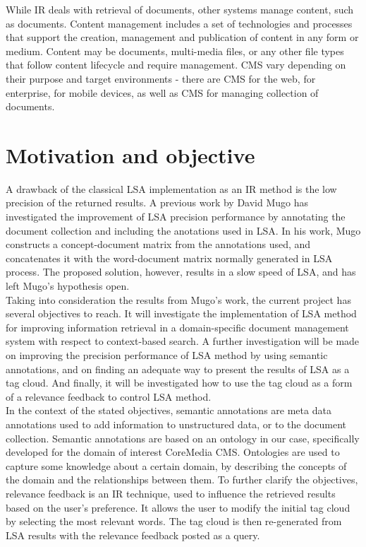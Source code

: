 \begin{center}
While \gls{IR} deals with retrieval of documents, other systems manage content, such as documents. Content management includes a set of technologies and processes that support the creation, management and publication of content in any form or medium. Content may be documents, multi-media files, or any other file types that follow content lifecycle and require management. \gls{CMS} vary depending on their purpose and target environments - there are \gls{CMS} for the web, for enterprise, for mobile devices, as well as \gls{CMS} for managing collection of documents. \\

\section{Motivation and objective}
\label{sec:introduction:motandobj}  
A drawback of the classical \gls{LSA} implementation as an \gls{IR} method is the low precision of the returned results. A previous work by David Mugo \cite{mugo10} has investigated the improvement of \gls{LSA} precision performance by annotating the document collection and including the anotations used in \gls{LSA}. In his work, Mugo constructs a concept-document matrix from the annotations used, and concatenates it with the word-document matrix normally generated in \gls{LSA} process. The proposed solution, however, results in a slow speed of \gls{LSA}, and has left Mugo's hypothesis open. \\

Taking into consideration the results from Mugo's work, the current project has several objectives to reach. It will investigate the implementation of \gls{LSA} method for improving information retrieval in a domain-specific document management system with respect to context-based search. A further investigation will be made on improving the precision performance of \gls{LSA} method by using semantic annotations, and on finding an adequate way to present the results of \gls{LSA} as a tag cloud. And finally, it will be investigated how to use the tag cloud as a form of a relevance feedback to control \gls{LSA} method. \\

In the context of the stated objectives, semantic annotations are meta data annotations used to add information to unstructured data, or to the document collection. Semantic annotations are based on an ontology in our case, specifically developed for the domain of interest CoreMedia \gls{CMS}. Ontologies are used to capture some knowledge about a certain domain, by describing the concepts of the domain and the relationships between them. To further clarify the objectives, relevance feedback is an \gls{IR} technique, used to influence the retrieved results based on the user's preference. It allows the user to modify the initial tag cloud by selecting the most relevant words. The tag cloud is then re-generated from \gls{LSA} results with the relevance feedback posted as a query. \\


\end{center}
